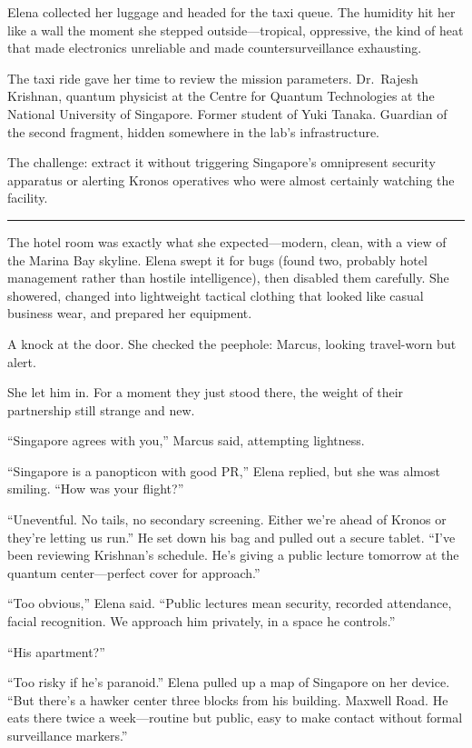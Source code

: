 Elena collected her luggage and headed for the taxi queue. The humidity hit her like a wall the moment she stepped outside---tropical, oppressive, the kind of heat that made electronics unreliable and made countersurveillance exhausting.

The taxi ride gave her time to review the mission parameters. Dr.~Rajesh Krishnan, quantum physicist at the Centre for Quantum Technologies at the National University of Singapore. Former student of Yuki Tanaka. Guardian of the second fragment, hidden somewhere in the lab's infrastructure.

The challenge: extract it without triggering Singapore's omnipresent security apparatus or alerting Kronos operatives who were almost certainly watching the facility.

\begin{center}\rule{0.5\linewidth}{0.5pt}\end{center}

The hotel room was exactly what she expected---modern, clean, with a view of the Marina Bay skyline. Elena swept it for bugs (found two, probably hotel management rather than hostile intelligence), then disabled them carefully. She showered, changed into lightweight tactical clothing that looked like casual business wear, and prepared her equipment.

A knock at the door. She checked the peephole: Marcus, looking travel-worn but alert.

She let him in. For a moment they just stood there, the weight of their partnership still strange and new.

``Singapore agrees with you,'' Marcus said, attempting lightness.

``Singapore is a panopticon with good PR,'' Elena replied, but she was almost smiling. ``How was your flight?''

``Uneventful. No tails, no secondary screening. Either we're ahead of Kronos or they're letting us run.'' He set down his bag and pulled out a secure tablet. ``I've been reviewing Krishnan's schedule. He's giving a public lecture tomorrow at the quantum center---perfect cover for approach.''

``Too obvious,'' Elena said. ``Public lectures mean security, recorded attendance, facial recognition. We approach him privately, in a space he controls.''

``His apartment?''

``Too risky if he's paranoid.'' Elena pulled up a map of Singapore on her device. ``But there's a hawker center three blocks from his building. Maxwell Road. He eats there twice a week---routine but public, easy to make contact without formal surveillance markers.''

